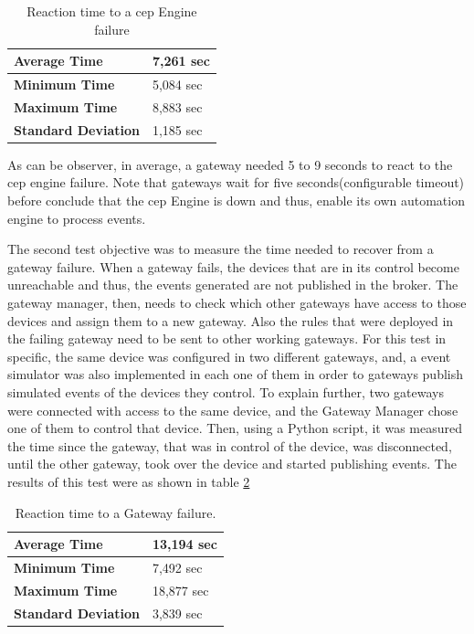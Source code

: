 \begin{table}[H]
	
	\begin{tabular}{|l|l|}
		\hline
		\textbf{Average Time}       & 7,261 sec \\ \hline
		\textbf{Minimum Time}       &  5,084 sec \\ \hline
		\textbf{Maximum Time}       & 8,883 sec \\ \hline
		\textbf{Standard Deviation} & 1,185 sec \\ \hline
	\end{tabular}
	\centering
	\caption{Reaction time to a \ac{cep} Engine failure}
	\label{cepDown}
\end{table}

As can be observer, in average, a gateway needed 5 to 9 seconds to react to the \ac{cep} engine failure. Note that gateways wait for five seconds(configurable timeout) before conclude that the \ac{cep} Engine is down and thus, enable its own automation engine to process events.


The second test objective was to measure the time needed to recover from a gateway failure. When a gateway fails, the devices that are in its control become unreachable and thus, the events generated are not published in the broker. The gateway manager, then, needs to check which other gateways have access to those devices and assign them to a new gateway. Also the rules that were deployed in the failing gateway need to be sent to other working gateways. For this test in specific, the same device was configured in two different gateways, and, a event simulator was also implemented in each one of them in order to gateways publish simulated events of the devices they control. To explain further, two gateways were connected with access to the same device, and the Gateway Manager chose one of them to control that device. Then, using a Python script, it was measured the time since the gateway, that was in control of the device, was disconnected, until the other gateway, took over the device and started publishing events. The results of this test were as shown in table \ref{gwdown}

 
\begin{table}[H]

	\begin{tabular}{|l|l|}
		\hline
		\textbf{Average Time}       & 13,194 sec \\ \hline
		\textbf{Minimum Time}       & 7,492 sec \\ \hline
		\textbf{Maximum Time}       & 18,877 sec \\ \hline
		\textbf{Standard Deviation} & 3,839 sec \\ \hline
	\end{tabular}
	\centering
	\caption{Reaction time to a Gateway failure.}
	\label{gwdown}
\end{table}

